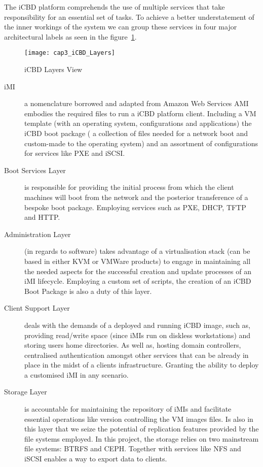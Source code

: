 
The iCBD platform comprehends the use of multiple services that take responsibility for an essential set of tasks. To achieve a better understatement of the inner workings of the system we can group these services in four major architectural labels as seen in the figure~\ref{fig:icbd_layers}.


\begin{figure}[htbp]
	\centering
	\texttt{[image: cap3\_iCBD\_Layers]}
	\caption{iCBD Layers View}
	\label{fig:icbd_layers}
\end{figure}


\begin{description}
	\item [\acrfull{iMI}] a nomenclature borrowed and adapted from Amazon Web Services AMI~\cite{aws_ami} embodies the required files to run a iCBD platform client. Including a VM template (with an operating system, configurations and applications) the iCBD boot package ( a collection of files needed for a network boot and custom-made to the operating system) and an assortment of configurations for services like PXE and iSCSI.
	\item [Boot Services Layer] is responsible for providing the initial process from which the client machines will boot from the network and the posterior transference of a bespoke boot package. Employing services such as \acrshort{PXE}, \acrshort{DHCP}, \acrshort{TFTP} and \acrshort{HTTP}.
	\item [Administration Layer] (in regards to software) takes advantage of a virtualisation stack (can be based in either \acrshort{KVM} or VMWare products) to engage in maintaining all the needed aspects for the successful creation and update processes of an \acrshort{iMI} lifecycle.  Employing a custom set of scripts, the creation of an iCBD Boot Package is also a duty of this layer. 
	\item [Client Support Layer] deals with the demands of a deployed and running iCBD image, such as, providing read/write space (since iMIs run on diskless workstations) and storing users home directories. As well as, hosting domain controllers, centralised authentication amongst other services that can be already in place in the midst of a clients infrastructure. Granting the ability to deploy a customised iMI in any scenario.
	\item [Storage Layer] is accountable for maintaining the repository of iMIs and facilitate essential operations like version controlling the VM images files. Is also in this layer that we seize the potential of replication features provided by the file systems employed. In this project, the storage relies on two mainstream file systems: BTRFS and CEPH. Together with services like \acrshort{NFS} and \acrshort{iSCSI} enables a way to export data to clients.
\end{description}
 
